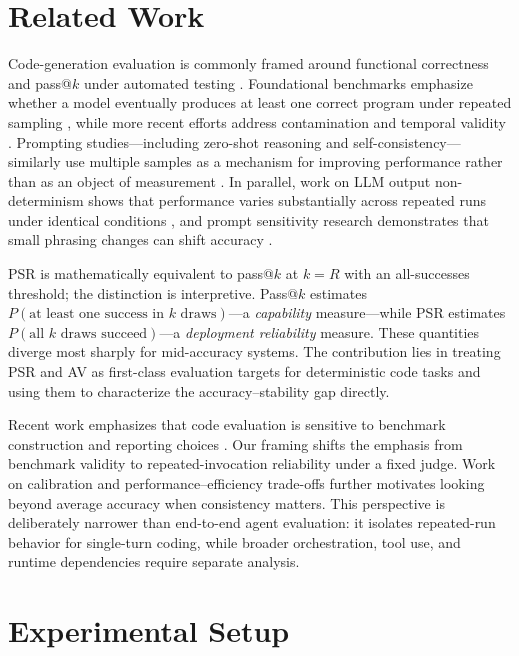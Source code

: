 \documentclass[11pt]{article}
\begin{document}
\section{Related Work}
Code-generation evaluation is commonly framed around functional correctness and pass@$k$ under automated testing \cite{chen2021codex,austin2021program}. Foundational benchmarks emphasize whether a model eventually produces at least one correct program under repeated sampling \cite{chen2021codex,austin2021program,hendrycks2021apps}, while more recent efforts address contamination and temporal validity \cite{jain2024livecodebench,jimenez2024swebench}. Prompting studies---including zero-shot reasoning and self-consistency---similarly use multiple samples as a mechanism for improving performance rather than as an object of measurement \cite{kojima2022zeroshot,wang2022self,aggarwal2023lets}. In parallel, work on LLM output non-determinism shows that performance varies substantially across repeated runs under identical conditions \cite{atil2024llm,alvarado2025repetitions}, and prompt sensitivity research demonstrates that small phrasing changes can shift accuracy \cite{zhuo2024prosa}.

PSR is mathematically equivalent to pass@$k$ at $k=R$ with an all-successes threshold; the distinction is interpretive. Pass@$k$ estimates $P(\text{at least one success in }k\text{ draws})$---a \emph{capability} measure---while PSR estimates $P(\text{all }k\text{ draws succeed})$---a \emph{deployment reliability} measure. These quantities diverge most sharply for mid-accuracy systems. The contribution lies in treating PSR and AV as first-class evaluation targets for deterministic code tasks and using them to characterize the accuracy--stability gap directly.

Recent work emphasizes that code evaluation is sensitive to benchmark construction and reporting choices \cite{liu2024your,du2024evaluating}. Our framing shifts the emphasis from benchmark validity to repeated-invocation reliability under a fixed judge. Work on calibration \cite{guo2017calibration} and performance--efficiency trade-offs \cite{zhang2026performance} further motivates looking beyond average accuracy when consistency matters. This perspective is deliberately narrower than end-to-end agent evaluation: it isolates repeated-run behavior for single-turn coding, while broader orchestration, tool use, and runtime dependencies require separate analysis.

\section{Experimental Setup}
\end{document}
